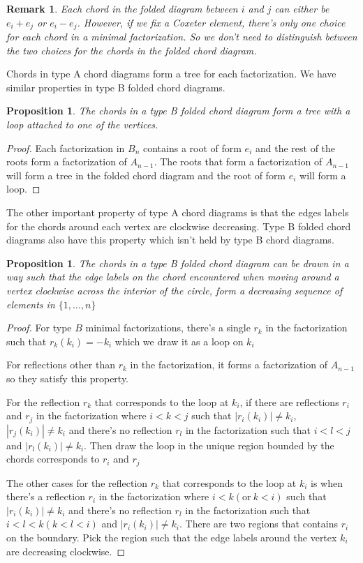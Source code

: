 \documentclass[11pt]{amsart}
\newtheorem{prop}[thm]{Proposition}%
\newtheorem{rema}[thm]{Remark}%
\begin{document}
\begin{rema}
    Each chord in the folded diagram between $i$ and $j$ can either be $e_i + e_j$ or $e_i-e_j$. However, if we fix a Coxeter element, there's only one choice for each chord in a minimal factorization. So we don't need to distinguish between the two choices for the chords in the folded chord diagram.
\end{rema}

Chords in type A chord diagrams form a tree for each factorization. We have similar properties in type B folded chord diagrams.

\begin{prop}
    The chords in a type B folded chord diagram form a tree with a loop attached to one of the vertices.
\end{prop}

\begin{proof}
    Each factorization in $B_n$ contains a root of form $e_i$ and the rest of the roots form a factorization of $A_{n-1}$. The roots that form a factorization of $A_{n-1}$ will form a tree in the folded chord diagram and the root of form $e_i$ will form a loop.
\end{proof}

The other important property of type A chord diagrams is that the edges labels for the chords around each vertex are clockwise decreasing. Type B folded chord diagrams also have this property which isn't held by type B chord diagrams.

\begin{prop}
    The chords in a type B folded chord diagram can be drawn in a way such that the edge labels on the chord encountered when moving around a vertex clockwise across the interior of the circle, form a decreasing sequence of elements in $\{1,\dots,n\}$
\end{prop}

\begin{proof}
    For type $B$ minimal factorizations, there's a single $r_k$ in the factorization such that $r_k(k_i)=-k_i$ which we draw it as a loop on $k_i$

    For reflections other than $r_k$ in the factorization, it forms a factorization of $A_{n-1}$ so they satisfy this property.
    
    For the reflection $r_k$ that corresponds to the loop at $k_i$, if there are reflections $r_i$ and $r_j$ in the factorization where $i < k < j$ such that $|r_i(k_i)| \neq k_i$, $|r_j(k_i)| \neq k_i$ and there's no reflection $r_l$ in the factorization such that $i < l < j$ and $|r_l(k_i)| \neq k_i$. Then draw the loop in the unique region bounded by the chords corresponds to $r_i$ and $r_j$

    The other cases for the reflection $r_k$ that corresponds to the loop at $k_i$ is when there's a reflection $r_i$ in the factorization where $i < k (\text{or} \ k < i)$ such that $|r_i(k_i)| \neq k_i$ and there's no reflection $r_l$ in the factorization such that $i < l < k (k < l < i)$ and $|r_i(k_i)| \neq k_i$. There are two regions that contains $r_i$ on the boundary. Pick the region such that the edge labels around the vertex $k_i$ are decreasing clockwise.
\end{proof}
\end{document}
